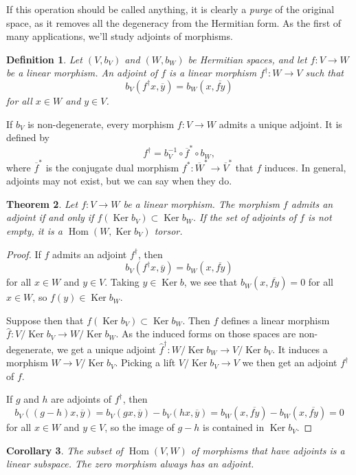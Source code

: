 \documentclass[10pt,a4paper]{article}
\newtheorem{theo}{Theorem}[section]
\newtheorem{coro}[theo]{Corollary}
\newtheorem{defi}[theo]{Definition}
\newtheorem*{proof}{Proof}
\def\ov#1{\overline{#1}}
\DeclareMathOperator{\Ker}{Ker}
\DeclareMathOperator{\Hom}{Hom}
\begin{document}
If this operation should be called anything, it is clearly a \emph{purge} of the original space, as it removes all the degeneracy from the Hermitian form. As the first of many applications, we'll study adjoints of morphisms.


\begin{defi}
Let $(V, b_V)$ and $(W, b_W)$ be Hermitian spaces, and let $f : V \to W$ be a linear morphism. An \emph{adjoint} of $f$ is a linear morphism $f^\dagger : W \to V$ such that
\[
b_V(f^\dagger x, \ov y)
= b_W(x, \ov{f y})
\]
for all $x \in W$ and $y \in V$.
\end{defi}


If $b_V$ is non-degenerate, every morphism $f : V \to W$ admits a unique adjoint. It is defined by
\[
f^\dagger = b_V^{-1} \circ \ov f^* \circ b_W,
\]
where $\ov f^*$ is the conjugate dual morphism $f^* : \ov W^* \to \ov V^*$ that $f$ induces. In general, adjoints may not exist, but we can say when they do.


\begin{theo}
Let $f : V \to W$ be a linear morphism. The morphism $f$ admits an adjoint if and only if $f(\Ker b_V) \subset \Ker b_W$. If the set of adjoints of $f$ is not empty, it is a $\Hom(W, \Ker b_V)$ torsor.
\end{theo}

\begin{proof}
If $f$ admits an adjoint $f^\dagger$, then
\[
b_V(f^\dagger x, \ov y)
= b_W(x, \ov{fy})
\]
for all $x \in W$ and $y \in V$. Taking $y \in \Ker b$, we see that $b_W(x, \ov{fy}) = 0$ for all $x \in W$, so $f(y) \in \Ker b_W$.

Suppose then that $f(\Ker b_V) \subset \Ker b_W$. Then $f$ defines a linear morphism $\hat f : V / \Ker b_V \to W / \Ker b_W$. As the induced forms on those spaces are non-degenerate, we get a unique adjoint $\hat f^\dagger : W / \Ker b_W \to V / \Ker b_V$. It induces a morphism $W \to V / \Ker b_V$. Picking a lift $V / \Ker b_V \to V$ we then get an adjoint $f^\dagger$ of $f$.

If $g$ and $h$ are adjoints of $f^\dagger$, then
\[
b_V((g - h)x, \ov y)
= b_V(gx, \ov y) - b_V(hx, \ov y)
= b_W(x, \ov{fy}) - b_W(x, \ov{fy})
= 0
\]
for all $x \in W$ and $y \in V$, so the image of $g - h$ is contained in $\Ker b_V$.
\end{proof}


\begin{coro}
The subset of $\Hom(V,W)$ of morphisms that have adjoints is a linear subspace.  The zero morphism always has an adjoint.
\end{coro}
\end{document}
